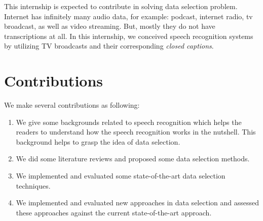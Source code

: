 
This internship is expected to contribute in solving data selection problem. Internet has infinitely many audio data, for example: podcast, internet radio, tv broadcast, as well as video streaming. But, mostly they do not have transcriptions at all. In this internship, we conceived speech recognition systems by utilizing TV broadcasts and their corresponding \textit{closed captions}. 

\section{Contributions}
We make several contributions as following:
\begin{enumerate}
\item We give some backgrounds related to speech recognition which helps the readers to understand how the speech recognition works in the nutshell. This background helps to grasp the idea of data selection.
\item We did some literature reviews and proposed some data selection methods.
\item  We implemented and evaluated some state-of-the-art data selection techniques. 
\item We implemented and evaluated new approaches in data selection and assessed these approaches against the current state-of-the-art approach. 
\end{enumerate}


